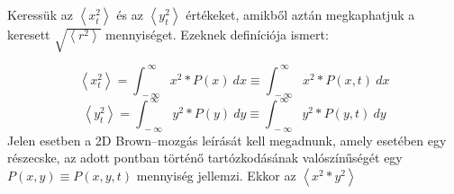 \section{} \label{sec:1}
\\ \\
Keressük az $\left< x_{t}^{2} \right>$ és az $\left< y_{t}^{2} \right>$ értékeket, amikből aztán megkaphatjuk a keresett $\sqrt{\left< r^{2} \right>}$ mennyiséget. Ezeknek definíciója ismert:

\begin{equation}
    \left< x_{t}^{2} \right>
    =
    \int_{\ -\infty}^{\ \infty} x^{2} * P \left( x \right)\ dx
    \equiv
    \int_{\ -\infty}^{\ \infty} x^{2} * P \left( x, t \right)\ dx
\end{equation}
\begin{equation}
    \left< y_{t}^{2} \right>
    =
    \int_{\ -\infty}^{\ \infty} y^{2} * P \left( y \right)\ dy
    \equiv
    \int_{\ -\infty}^{\ \infty} y^{2} * P \left( y, t \right)\ dy
\end{equation}
Jelen esetben a 2D Brown--mozgás leírását kell megadnunk, amely esetében egy részecske, az adott pontban történő tartózkodásának valószínűségét egy $P \left( x, y \right) \equiv P \left( x, y, t \right)$ mennyiség jellemzi. Ekkor az $\left< x^{2} * y^{2} \right>$ 